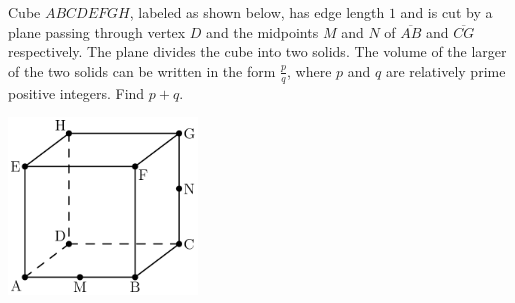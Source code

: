 Cube $ABCDEFGH$, labeled as shown below, has edge length $1$ and is cut by a plane passing through vertex $D$ and the midpoints $M$ and $N$ of $\overline{AB}$ and $\overline{CG}$ respectively. The plane divides the cube into two solids. The volume of the larger of the two solids can be written in the form $\frac{p}{q}$, where $p$ and $q$ are relatively prime positive integers. Find $p+q$.
\begin{center}
\includegraphics[width = 50.400000000000006mm]{img/fig0.png}
\end{center}